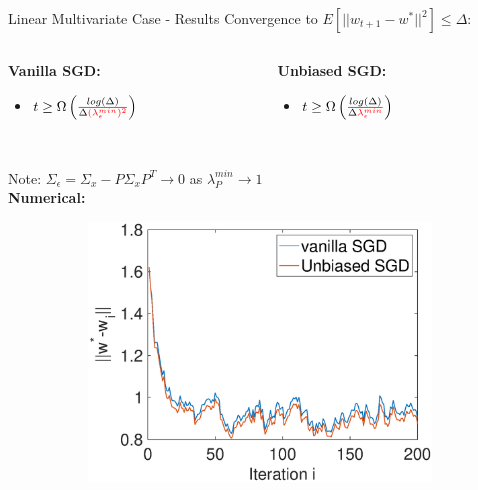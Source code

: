 \documentclass{beamer}
\begin{document}
\begin{frame}{Linear Multivariate Case - Results}
    Convergence to $E[||w_{t+1}-w^*||^2]\leq\Delta$:\\
    \newline
    \begin{columns}
        \begin{column}{0.483\textwidth}
            \newline 
            \textbf{Vanilla SGD:}
            \begin{itemize}
                \item  $t \geq \Omega\left(\frac{log(\Delta)}{\Delta \textcolor{red}{(\lambda_{\epsilon}^{min})^2}}\right)$
            \end{itemize}
        \end{column}
        \begin{column}{0.483\textwidth}
            \newline 
            \textbf{Unbiased SGD:}
            \begin{itemize}
                \item $t \geq \Omega\left(\frac{log(\Delta)}{\Delta\textcolor{red}{ \lambda_{\epsilon}^{min}}}\right)$
            \end{itemize}
        \end{column}
    \end{columns}\\
    Note: $\Sigma_\epsilon = \Sigma_x-P\Sigma_xP^T\rightarrow 0$ as $\lambda_P^{min}\rightarrow1$\\
    \textbf{Numerical:}
    \begin{figure}[h]
    \centering
    \begin{subfigure}{0.45\textwidth}
        \centering
        \includegraphics[width=\textwidth]{AR1_rho01Multivariate.eps}

\end{subfigure}
\end{figure}
\end{frame}
\end{document}
